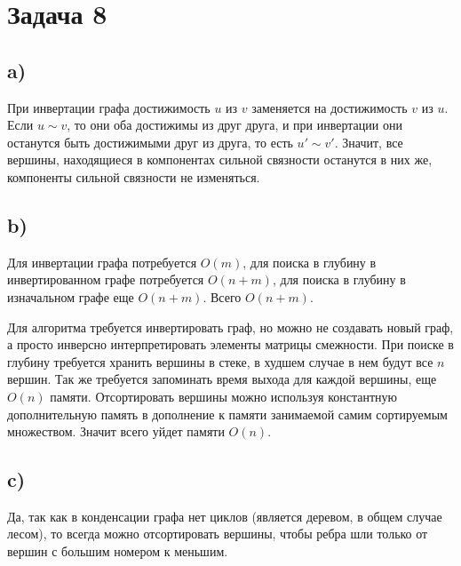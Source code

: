 \documentclass[a4paper,12pt]{article} %
\begin{document}
\section{Задача 8}
\subsection{a)}
\hspace{5mm}
При инвертации графа достижимость $u$ из $v$ заменяется на достижимость $v$ из $u$. Если $u\sim v$, то они оба достижимы из друг друга, и при инвертации они останутся быть достижимыми друг из друга, то есть $u'\sim v'$. Значит, все вершины, находящиеся в компонентах сильной связности останутся в них же, компоненты сильной связности не изменяться.

\subsection{b)}
\hspace{5mm}
Для инвертации графа потребуется $O(m)$, для поиска в глубину в инвертированном графе потребуется $O(n+m)$, для поиска в глубину в изначальном графе еще $O(n+m)$. Всего $O(n+m)$. 

Для алгоритма требуется инвертировать граф, но можно не создавать новый граф, а просто инверсно интерпретировать элементы матрицы смежности. При поиске в глубину требуется хранить вершины в стеке, в худшем случае в нем будут все $n$ вершин. Так же требуется запоминать время выхода для каждой вершины, еще $O(n)$ памяти. Отсортировать вершины можно используя константную дополнительную память в дополнение к памяти занимаемой самим сортируемым множеством. Значит всего уйдет памяти $O(n)$.

\subsection{c)}
\hspace{5mm}
Да, так как в конденсации графа нет циклов (является деревом, в общем случае лесом), то всегда можно отсортировать вершины, чтобы ребра шли только от вершин с большим номером к меньшим.
\end{document}
